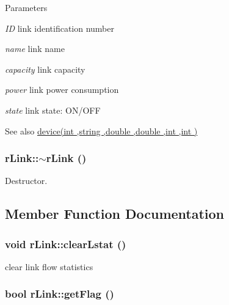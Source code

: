\begin{DoxyParams}{Parameters}
\item[{\em ID}]link identification number \item[{\em name}]link name \item[{\em capacity}]link capacity \item[{\em power}]link power consumption \item[{\em state}]link state: ON/OFF \end{DoxyParams}
\begin{DoxySeeAlso}{See also}
\hyperlink{classdevice_a57b9c4ac7a8bd970b81b1154ae79a5de}{device(int ,string ,double ,double ,int ,int )} 
\end{DoxySeeAlso}
\hypertarget{classrLink_ac2f6e30278ba2967b96086435711f672}{
\subsubsection[{$\sim$rLink}]{\setlength{\rightskip}{0pt plus 5cm}rLink::$\sim$rLink ()}}
\label{classrLink_ac2f6e30278ba2967b96086435711f672}


Destructor. 



\subsection{Member Function Documentation}
\hypertarget{classrLink_a60204cffa46245fb1e2c7d7a7872dbcb}{
\subsubsection[{clearLstat}]{\setlength{\rightskip}{0pt plus 5cm}void rLink::clearLstat ()}}
\label{classrLink_a60204cffa46245fb1e2c7d7a7872dbcb}


clear link flow statistics 

\hypertarget{classrLink_a4639d6b69acbb669d0cbb7af5cbf152b}{
\subsubsection[{getFlag}]{\setlength{\rightskip}{0pt plus 5cm}bool rLink::getFlag ()}}
\label{classrLink_a4639d6b69acbb669d0cbb7af5cbf152b}


